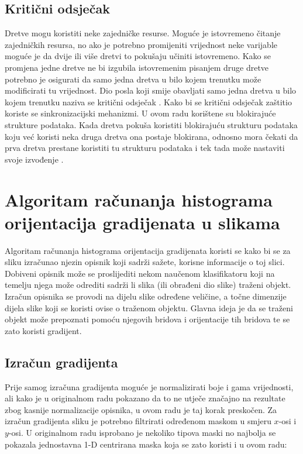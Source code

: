 \documentclass[times, utf8, zavrsni]{fer}
\begin{document}
\def\UrlBreaks{\do\/\do-}

\section{Kritični odsječak}
Dretve mogu koristiti neke zajedničke resurse. Moguće je istovremeno čitanje zajedničkih resursa, no ako je potrebno promijeniti vrijednost neke varijable moguće je da dvije ili više dretvi to pokušaju učiniti istovremeno. Kako se promjena jedne dretve ne bi izgubila istovremenim pisanjem druge dretve potrebno je osigurati da samo jedna dretva u bilo kojem trenutku može modificirati tu vrijednost. Dio posla koji smije obavljati samo jedna dretva u bilo kojem trenutku naziva se kritični odsječak . Kako bi se kritični odsječak zaštitio koriste se sinkronizacijski mehanizmi. U ovom radu korištene su blokirajuće strukture podataka. Kada dretva pokuša koristiti blokirajuću strukturu podataka koju već koristi neka druga dretva ona postaje blokirana, odnosno mora čekati da prva dretva prestane koristiti tu strukturu podataka i tek tada može nastaviti svoje izvođenje \citep{os}.

\chapter{Algoritam računanja histograma orijentacija gradijenata u slikama}
Algoritam računanja histograma orijentacija gradijenata  koristi se kako bi se za sliku izračunao njezin opisnik koji sadrži sažete, korisne informacije o toj slici. Dobiveni opisnik može se proslijediti nekom naučenom klasifikatoru koji na temelju njega može odrediti sadrži li slika (ili obrađeni dio slike) traženi objekt. Izračun opisnika se provodi na dijelu slike određene veličine, a točne dimenzije dijela slike koji se koristi ovise o traženom objektu. Glavna ideja je da se traženi objekt može prepoznati pomoću njegovih bridova i orijentacije tih bridova te se zato koristi gradijent.

\section{Izračun gradijenta}
Prije samog izračuna gradijenta moguće je normalizirati boje i gama vrijednosti, ali kako je u originalnom radu \citep{dalal2005histograms} pokazano da to ne utječe značajno na rezultate zbog kasnije normalizacije opisnika, u ovom radu je taj korak preskočen. Za izračun gradijenta sliku je potrebno filtrirati određenom maskom u smjeru \(x\)-osi i \(y\)-osi. U originalnom radu \citep{dalal2005histograms} isprobano je nekoliko tipova maski no najbolja se pokazala jednostavna 1-D centrirana maska koja se zato koristi i u ovom radu: 
\end{document}
